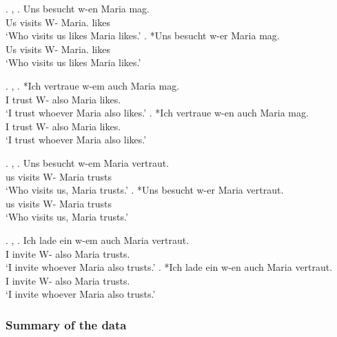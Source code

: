 \ex. , 
\ag. Uns besucht w-en Maria mag.\\
 Us visits\scsub{[nom]} W- Maria. likes\scsub{[acc]}\\
 `Who visits us likes Maria likes.' \hfill \citep[343]{vogel2001}
\bg. *Uns besucht w-er Maria mag.\\
 Us visits\scsub{[nom]} W- Maria. likes\scsub{[acc]}\\
 `Who visits us likes Maria likes.' \hfill \citep[343]{vogel2001}

 \ex. , 
\ag. *Ich vertraue w-em auch Maria mag. \\
 I trust\scsub{[dat]} W- also Maria likes\scsub{[acc]}.\\
 `I trust whoever Maria also likes.' \hfill \citep[345]{vogel2001}
\bg. *Ich vertraue w-en auch Maria mag. \\
 I trust\scsub{[dat]} W- also Maria likes\scsub{[acc]}.\\
 `I trust whoever Maria also likes.' \hfill \citep[345]{vogel2001}

\ex. , 
\ag. Uns besucht w-em Maria vertraut.\\
 us visits\scsub{[nom]} W- Maria trusts\scsub{[dat]}\\
 `Who visits us, Maria trusts.' \hfill \citep[343]{vogel2001}
\bg. *Uns besucht w-er Maria vertraut.\\
 us visits\scsub{[nom]} W- Maria trusts\scsub{[dat]}\\
 `Who visits us, Maria trusts.' \hfill \citep[343]{vogel2001}

\ex. , 
\ag. Ich {lade ein} w-em auch Maria vertraut. \\
 I invite\scsub{[acc]} W- also Maria trusts\scsub{[dat]}.\\
 `I invite whoever Maria also trusts.' \hfill \citep[344]{vogel2001}
\bg. *Ich {lade ein} w-en auch Maria vertraut. \\
 I invite\scsub{[acc]} W- also Maria trusts\scsub{[dat]}.\\
 `I invite whoever Maria also trusts.' \hfill \citep[344]{vogel2001}

\subsubsection{Summary of the data}

